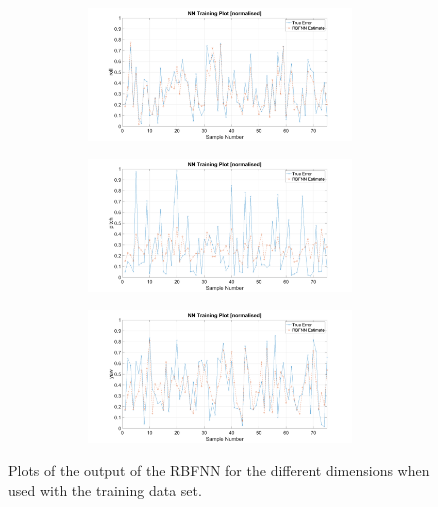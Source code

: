 \begin{figure}
\begin{subfigure}{0.48\textwidth}
\begin{subfigure}{\textwidth}
    \end{subfigure}
    \caption{}
  \end{subfigure}
  \begin{subfigure}{0.48\textwidth}
    \begin{subfigure}{\textwidth}
      \includegraphics[clip, trim = 100 0 100 0, width=\textwidth]{figures/chapter4/tr_roll}
    \end{subfigure}
    \begin{subfigure}{\textwidth}
      \includegraphics[clip, trim = 100 0 100 0, width=\textwidth]{figures/chapter4/tr_pitch}
    \end{subfigure}
    \begin{subfigure}{\textwidth}
      \includegraphics[clip, trim = 100 0 100 0, width=\textwidth]{figures/chapter4/tr_yaw}
    \end{subfigure}
    \caption{}
  \end{subfigure}
  \caption[The output of the RBFNN when used with the training set input.]{Plots of the output of the RBFNN for the different dimensions when used with the training data set.}
  \label{fig:chap4-rbf-train}
\end{figure}

